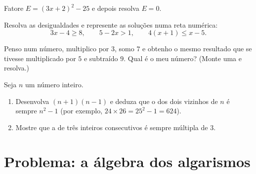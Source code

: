 \begin{exercise}[$\star\star$]\label{exo:g9:algebra:7}
Fatore $E = (3x + 2)^2 - 25$ e depois resolva $E = 0$.
\end{exercise}

\begin{exercise}[$\star\star$]\label{exo:g9:algebra:8}
Resolva as desigualdades e represente as soluções numa reta numérica:
\[
3x - 4 \geq 8, \qquad
5 - 2x > 1, \qquad
4(x + 1) \leq x - 5 .
\]
\end{exercise}

\begin{exercise}[$\star\star$]\label{exo:g9:algebra:9}
Penso num número, multiplico por $3$, somo $7$ e obtenho o mesmo
resultado que se tivesse multiplicado por $5$ e subtraído $9$. Qual é o
meu número? (Monte uma  e resolva.)
\end{exercise}

\begin{exercise}[$\star\star\star$]\label{exo:g9:algebra:10}
Seja $n$ um número inteiro.
\begin{enumerate}
  \item Desenvolva $(n + 1)(n - 1)$ e deduza que o  dos dois
        vizinhos de $n$ é sempre $n^2 - 1$ (por exemplo,
        $24 \times 26 = 25^2 - 1 = 624$).
  \item Mostre que a  de três inteiros consecutivos é sempre
        múltipla de $3$.
\end{enumerate}
\end{exercise}

\section{Problema: a álgebra dos algarismos}

